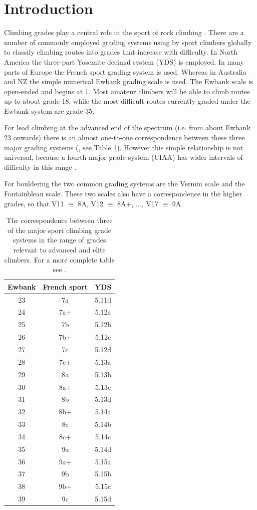 \documentclass{article}
\begin{document}
\section*{Introduction}

Climbing grades play a central role in the sport of rock climbing \cite{delignieres1993psychophysical,draper2015comparative}. There are a number of commonly employed grading systems using by sport climbers globally to classify climbing routes into grades that increase with difficulty. In North America the three-part Yosemite decimal system (YDS) is employed. In many parts of Europe the French sport grading system is used. Whereas in Australia and NZ the simple numerical Ewbank grading scale is used. The Ewbank scale is open-ended and begins at 1. Most amateur climbers will be able to climb routes up to about grade 18, while the most difficult routes currently graded under the Ewbank system are grade 35. 

For lead climbing at the advanced end of the spectrum (i.e. from about Ewbank 23 onwards) there is an almost one-to-one correspondence between these three major grading systems (\cite{draper2015comparative}, see Table \ref{table1}). However this simple relationship is not universal, because a fourth major grade system (UIAA) has wider intervals of difficulty in this range \cite{draper2015comparative}.

For bouldering the two common grading systems are the Vermin scale and the Fontainbleau scale. These two scales also have a correspondence in the higher grades, so that V11 $\equiv$ 8A, V12 $\equiv$ 8A+, $\dots$, V17 $\equiv$ 9A.


\begin{table}
\centering
\begin{tabular}{| c | c | c |}
  \hline			
  {\bf Ewbank} & {\bf French sport} & {\bf YDS} \\
  \hline			
  23 & 7a & 5.11d \\
  24 & 7a+ & 5.12a \\
  25 & 7b & 5.12b \\
  26 & 7b+ & 5.12c \\
  27 & 7c & 5.12d \\
  28 & 7c+ & 5.13a \\
  29 & 8a & 5.13b \\
  30 & 8a+ & 5.13c \\
  31 & 8b & 5.13d \\
  32 & 8b+ & 5.14a \\
  33 & 8c & 5.14b \\
  34 & 8c+ & 5.14c \\
  35 & 9a & 5.14d \\
  36 & 9a+ & 5.15a \\
  37 & 9b & 5.15b \\
  38 & 9b+ & 5.15c \\
  39 & 9c & 5.15d \\
  \hline  
\end{tabular}
\caption{The correspondence between three of the major sport climbing grade systems in the range of grades relevant to advanced and elite climbers. For a more complete table see \cite{draper2015comparative}. }
\label{table1}
\end{table}
\end{document}

